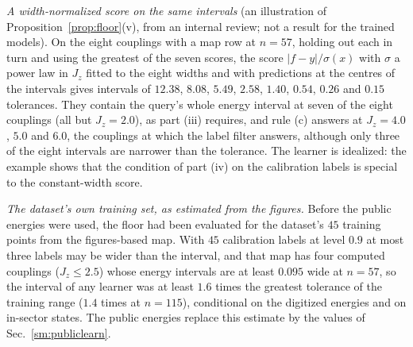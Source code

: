 \documentclass[aps,prx,onecolumn,10pt,nofootinbib,longbibliography,floatfix]{revtex4-2}
\theoremstyle{remark}
\newcommand{\Jz}{J_z}
\begin{document}
\emph{A width-normalized score on the same intervals} (an illustration of Proposition~\ref{prop:floor}(v), from an
internal review; not a result for the trained models). On the eight couplings with a map row at $n=57$, holding out each %
in turn and using the greatest of the seven scores, the score $|f-y|/\sigma(x)$ with $\sigma$ a power law in $\Jz$
fitted to the eight widths and with predictions at the centres of the intervals gives intervals of $12.38$, %
$8.08$, $5.49$, $2.58$, $1.40$, $0.54$, $0.26$ and $0.15$ tolerances. They contain the query's whole energy %
interval at seven of the eight couplings (all but $\Jz=2.0$), as part (iii) requires, and rule (c) answers at $\Jz=4.0$, $5.0$ and
$6.0$, the couplings at which the label filter answers, although only three of the eight intervals are narrower %
than the tolerance. The learner is idealized: the example shows that the condition of part (iv) on the calibration
labels is special to the constant-width score.

\emph{The dataset's own training set, as estimated from the figures.} Before the public energies were used, the
floor had been evaluated for the dataset's $45$ training points from the figures-based map. With $45$ calibration
labels at level $0.9$ at most three labels may be wider than the interval, and that map has four computed %
couplings ($\Jz\le2.5$) whose energy intervals are at least $0.095$ wide at $n=57$, so the interval of any learner %
was at least $1.6$ times the greatest tolerance of the training range ($1.4$ times at $n=115$), conditional on %
the digitized energies and on in-sector states. The public energies replace this estimate by the values of
Sec.~\ref{sm:publiclearn}.

\needspace{400pt} %
\def\SMcap{Proposition~2 for the cubic model on the emulated labels, from the stored windows at each label's energy. Training couplings: %
model and calibration without the coupling (in distribution); test couplings ($1.1$--$1.4$): model and calibration on %
all training couplings. Each entry is a lower and an upper value: lower from the inner widths (zero at a coupling
without a map row), upper from the outer widths; $^\dagger$: the upper value uses widths interpolated at $\Jz=2.2$ %
and $3.5$ ($n=57$) and is indicative. Rule (c): answer iff the upper width of (b) is at most $\tau$.}\def\SMlab{tab:learn_prop2} %
\LTclearhead

\end{document}
